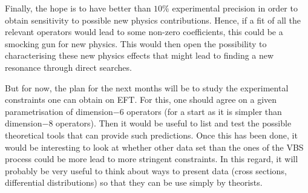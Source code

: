 Finally, the hope is to have better than $10\%$ experimental precision in order to obtain sensitivity to possible new physics contributions.
Hence, if a fit of all the relevant operators would lead to some non-zero coefficients, this could be a smocking gun for new physics.
This would then open the possibility to characterising these new physics effects that might lead to finding a new resonance through direct searches.

But for now, the plan for the next months will be to study the experimental constraints one can obtain on EFT.
For this, one should agree on a given parametrisation of dimension$-6$ operators (for a start as it is simpler than dimension$-8$ operators).
Then it would be useful to list and test the possible theoretical tools that can provide such predictions.
Once this has been done, it would be interesting to look at whether other data set than the ones of the VBS process could be more lead to more stringent constraints.
In this regard, it will probably be very useful to think about ways to present data (cross sections, differential distributions) so that they can be use simply by theorists.
